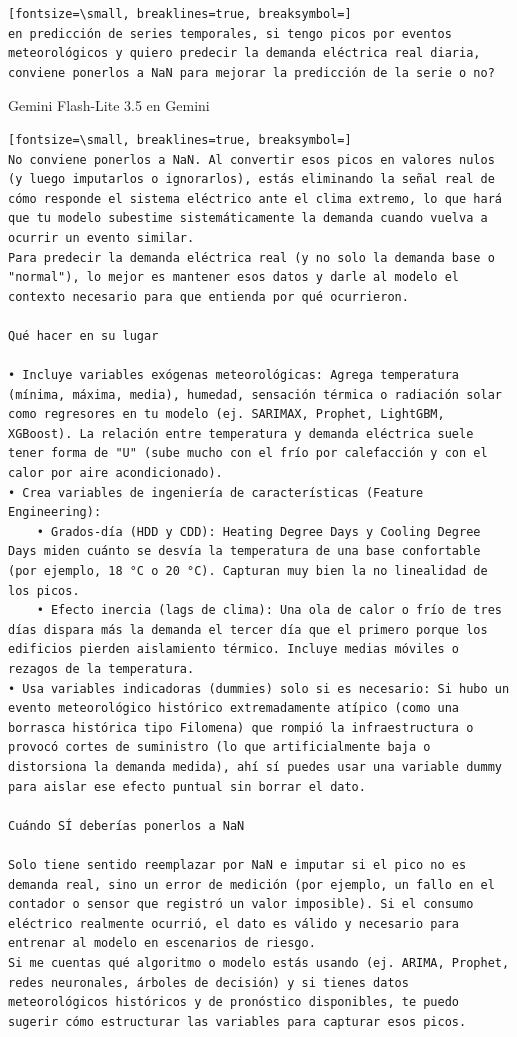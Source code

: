 \documentclass[12pt,a4paper,oneside]{book}
\begin{document}
\begin{iaprompt}
\begin{Verbatim}[fontsize=\small, breaklines=true, breaksymbol=]
en predicción de series temporales, si tengo picos por eventos meteorológicos y quiero predecir la demanda eléctrica real diaria, conviene ponerlos a NaN para mejorar la predicción de la serie o no?
\end{Verbatim}
\end{iaprompt}
\begin{iaresp}{Gemini Flash-Lite 3.5 en Gemini}
\begin{Verbatim}[fontsize=\small, breaklines=true, breaksymbol=]
No conviene ponerlos a NaN. Al convertir esos picos en valores nulos (y luego imputarlos o ignorarlos), estás eliminando la señal real de cómo responde el sistema eléctrico ante el clima extremo, lo que hará que tu modelo subestime sistemáticamente la demanda cuando vuelva a ocurrir un evento similar.
Para predecir la demanda eléctrica real (y no solo la demanda base o "normal"), lo mejor es mantener esos datos y darle al modelo el contexto necesario para que entienda por qué ocurrieron.

Qué hacer en su lugar

• Incluye variables exógenas meteorológicas: Agrega temperatura (mínima, máxima, media), humedad, sensación térmica o radiación solar como regresores en tu modelo (ej. SARIMAX, Prophet, LightGBM, XGBoost). La relación entre temperatura y demanda eléctrica suele tener forma de "U" (sube mucho con el frío por calefacción y con el calor por aire acondicionado).
• Crea variables de ingeniería de características (Feature Engineering):
	• Grados-día (HDD y CDD): Heating Degree Days y Cooling Degree Days miden cuánto se desvía la temperatura de una base confortable (por ejemplo, 18 °C o 20 °C). Capturan muy bien la no linealidad de los picos.
	• Efecto inercia (lags de clima): Una ola de calor o frío de tres días dispara más la demanda el tercer día que el primero porque los edificios pierden aislamiento térmico. Incluye medias móviles o rezagos de la temperatura.
• Usa variables indicadoras (dummies) solo si es necesario: Si hubo un evento meteorológico histórico extremadamente atípico (como una borrasca histórica tipo Filomena) que rompió la infraestructura o provocó cortes de suministro (lo que artificialmente baja o distorsiona la demanda medida), ahí sí puedes usar una variable dummy para aislar ese efecto puntual sin borrar el dato.

Cuándo SÍ deberías ponerlos a NaN

Solo tiene sentido reemplazar por NaN e imputar si el pico no es demanda real, sino un error de medición (por ejemplo, un fallo en el contador o sensor que registró un valor imposible). Si el consumo eléctrico realmente ocurrió, el dato es válido y necesario para entrenar al modelo en escenarios de riesgo.
Si me cuentas qué algoritmo o modelo estás usando (ej. ARIMA, Prophet, redes neuronales, árboles de decisión) y si tienes datos meteorológicos históricos y de pronóstico disponibles, te puedo sugerir cómo estructurar las variables para capturar esos picos.
\end{Verbatim}
\end{iaresp}
\end{document}
